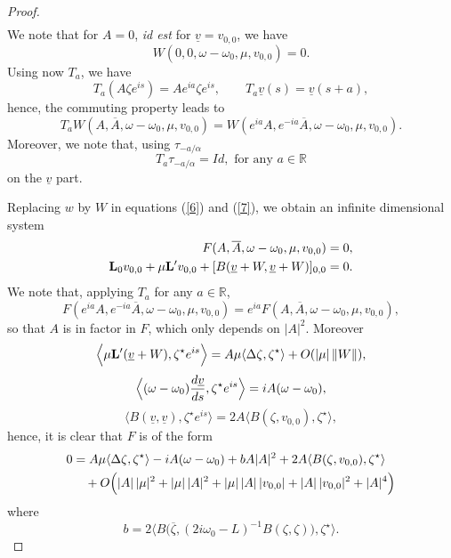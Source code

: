 \documentclass[11pt]{article}
\begin{document}
\begin{proof}
\begin{align*}
\end{align*}
We note that for $A = 0$, {\it id est} for $\underline{v} = v_{0,0}$, we have
$$
W(0,0,\omega - \omega_0,\mu,v_{0,0}) = 0.
$$
Using now $T_a$, we have
$$
T_a( A\zeta e^{is} ) = A e^{i a} \zeta e^{is},
\qquad
T_a \underline{v}(s) = \underline{v}(s+a),
$$
hence, the commuting property leads to
$$
T_a W (A, \overline{A}, \omega - \omega_0, \mu, v_{0,0}) 
= W(e^{i a} A , e^{- i a } \overline{A}, \omega - \omega_0, \mu, v_{0,0}).
$$
 Moreover, we note that,  using $\tau_{-a / \alpha}$
\begin{equation} \label{propagation}
T_a \tau_{-a / \alpha} = Id, \text{ for any } a\in \mathbb{R}
\end{equation}
on the $\underline{v}$ part.

Replacing $w$ by $W$ in equations (\ref{6}) and (\ref{7}), we obtain an infinite
dimensional system
\begin{align*}
F(A, \overline{A}, \omega - \omega_0, \mu, v_{0,0}) &= 0,
\\
{\bf L}_{0} v_{0,0} + \mu {\bf L}' v_{0,0} 
+ [ B(\underline{v} + W, \underline{v} + W) ]_{0,0} &= 0.
\end{align*}
We note that, applying $T_a$ for any $a \in \mathbb{R}$,
$$
F(e^{i a } A , e^{- i a} \overline{A}, \omega - \omega_0, \mu, v_{0,0} )
= e^{ia} F(A, \overline{A}, \omega - \omega_0, \mu, v_{0,0} ),
$$
so that $A$ is in factor in $F$, which only depends on $|A|^2$. Moreover
$$
\Big\langle \mu {\bf L}' (\underline{v} + W), \zeta^\star e^{is} \Big\rangle
= A \mu \langle \Delta \zeta, \zeta^\star \rangle+ O( | \mu | \, \| W \|),
$$
$$
\Big\langle (\omega - \omega_0) {d\underline{v} \over ds}, \zeta^\star e^{is} \Big\rangle
= i A (\omega - \omega_0),
$$
$$
\Big\langle B(\underline v, \underline v), \zeta^\star e^{is} \Big\rangle
= 2 A \Big\langle B(\zeta, v_{0,0} ), \zeta^\star \Big\rangle,
$$
hence, it is clear that $F$ is of the form
\begin{align} \label{8}
0 &= A \mu \langle \Delta \zeta, \zeta^\star \rangle
- i A (\omega - \omega_0) + b A |A|^2 + 2 A \langle B(\zeta,v_{0,0}),\zeta^\star \rangle
\\
& \quad + 
O\Bigl( |A| \, |\mu|^2 + |\mu| \, |A|^2
+ |\mu| \, |A| \, |v_{0,0} |
+ |A| \, |v_{0,0}|^2 + |A|^4 \Bigr)
\end{align}
where
\begin{equation} \label{9}
b = 2 \Big\langle B \Big( \overline{\zeta}, (2 i \omega_0 - L)^{-1} B(\zeta,\zeta) \Big), \zeta^\star  \Big\rangle.
\end{equation}

\end{proof}
\end{document}
